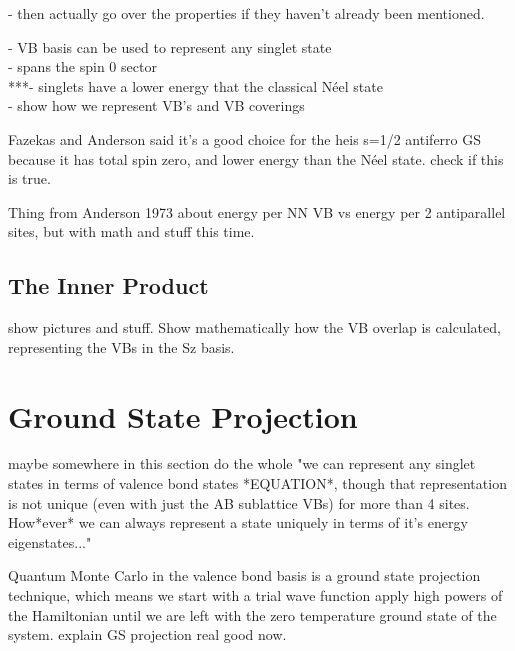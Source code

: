 {\color{red}
- then actually go over the properties if they haven't already been mentioned.

- VB basis can be used to represent any singlet state\\
- spans the spin 0 sector\\
***- singlets have a lower energy that the classical N\'eel state\\
- show how we represent VB's and VB coverings
}

{\color{red} Fazekas and Anderson said it's a good choice for the heis s=1/2 antiferro GS
because it has total spin zero, and lower energy than the N\'eel state.  check if this is true.}

{\color{red} Thing from Anderson 1973 about energy per NN VB vs energy per 2 antiparallel sites,
but with math and stuff this time.}

\subsection{The Inner Product}

{\color{red} show pictures and stuff.  Show mathematically how the VB overlap is calculated,
representing the VBs in the Sz basis.}


\section{Ground State Projection} \label{gsp}
{\color{red} maybe somewhere in this section do the whole "we can represent any singlet states in
terms of valence bond states *EQUATION*, though that representation is not unique (even with just
the AB sublattice VBs) for more than 4 sites.  How*ever* we can always represent a state uniquely 
in terms of it's energy eigenstates..."}

Quantum Monte Carlo in the valence bond basis is a ground state projection technique, 
which means we start with a trial wave function apply high powers of the Hamiltonian until 
we are left with the zero temperature ground state of the system. 
{\color{red} explain GS projection real good now.}


